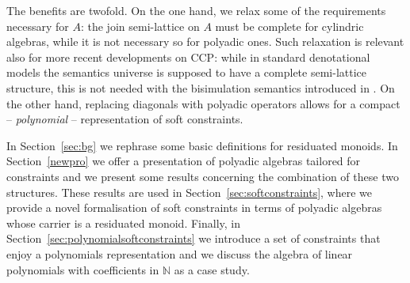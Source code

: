 \documentclass{llncs}
\begin{document}
The benefits are twofold. On the one hand, we relax some of the requirements necessary for $A$: the join semi-lattice on $A$ must be complete for cylindric algebras, while it is not necessary so for polyadic ones. Such relaxation is relevant also for more recent developments on CCP: while in standard denotational models the semantics universe is supposed to have a complete semi-lattice structure, this is not needed with 
the bisimulation semantics introduced in \cite{pippo}.
%
On the other hand, replacing diagonals with polyadic operators allows for a compact -- \emph{polynomial} -- representation of soft constraints.

In Section~\ref{sec:bg} we rephrase some basic definitions for residuated monoids. 
In Section~\ref{newpro} we offer a presentation of polyadic algebras tailored for constraints and we present some results 
concerning the combination of these two structures.
%
These results are used in Section~\ref{sec:softconstraints}, where we provide a novel formalisation of soft constraints in terms of polyadic algebras whose carrier is a residuated monoid. 
%
Finally, in Section~\ref{sec:polynomialsoftconstraints} we introduce a set of constraints that enjoy a polynomials representation 
and we discuss the algebra of linear polynomials with coefficients in $\mathbb{N}$ as a case study.
\end{document}
